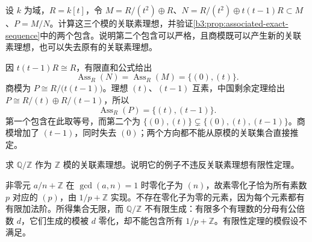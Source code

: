 \begin{exercise}\label{b3:ex:04-exact-quotient-warning}
	设 \(k\) 为域，\(R=k[t]\)，令 \(M=R/(t^2)\oplus R\)、\(N=R/(t^2)\oplus t(t-1)R\subset M\)、\(P=M/N\)。计算这三个模的关联素理想，并验证\cref{b3:prop:associated-exact-sequence}中的两个包含。说明第二个包含可以严格，且商模既可以产生新的关联素理想，也可以失去原有的关联素理想。
\end{exercise}
\begin{solution}
	因 \(t(t-1)R\cong R\)，有限直和公式给出
	\[
		\operatorname{Ass}_R(N)=\operatorname{Ass}_R(M)=\{(0),(t)\}.
	\]
	商模为 \(P\cong R/\bigl(t(t-1)\bigr)\)。理想 \((t)\)、\((t-1)\) 互素，中国剩余定理给出 \(P\cong R/(t)\oplus R/(t-1)\)，所以
	\[
		\operatorname{Ass}_R(P)=\{(t),(t-1)\}.
	\]
	第一个包含在此取等号，而第二个为 \(\{(0),(t)\}\subsetneq\{(0),(t),(t-1)\}\)。商模增加了 \((t-1)\)，同时失去 \((0)\)；两个方向都不能从原模的关联集合直接推定。
\end{solution}

\begin{exercise}\label{b3:ex:04-infinite-associated}
	求 \(\mathbb Q/\mathbb Z\) 作为 \(\mathbb Z\) 模的关联素理想。说明它的例子不违反关联素理想有限性定理。
\end{exercise}
\begin{solution}
	非零元 \(a/n+\mathbb Z\) 在 \(\gcd(a,n)=1\) 时零化子为 \((n)\)，故素零化子恰为所有素数 \(p\) 对应的 \((p)\)，由 \(1/p+\mathbb Z\) 实现。不存在零化子为零的元素，因为每个元素都有有限加法阶。所得集合无限，而 \(\mathbb Q/\mathbb Z\) 不有限生成：有限多个有理数的分母有公倍数 \(d\)，它们生成的模被 \(d\) 零化，却不能包含所有 \(1/p+\mathbb Z\)。有限性定理的模假设不满足。
\end{solution}

